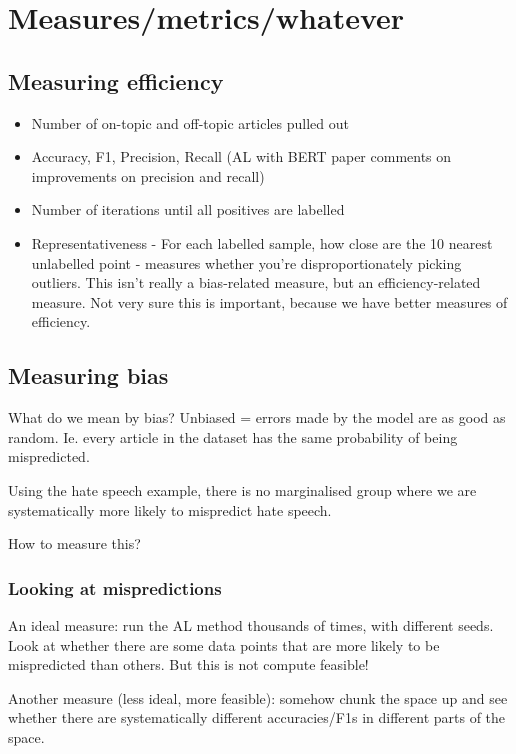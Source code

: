\documentclass[11pt]{article}
\begin{document}
\section{Measures/metrics/whatever}

\subsection{Measuring efficiency}

\begin{itemize}
    \item Number of on-topic and off-topic articles pulled out
    \item Accuracy, F1, Precision, Recall (AL with BERT paper comments on improvements on precision and recall)
    \item Number of iterations until all positives are labelled 
    \item Representativeness - For each labelled sample, how close are the 10 nearest unlabelled point - measures whether you’re disproportionately picking outliers. This isn’t really a bias-related measure, but an efficiency-related measure. Not very sure this is important, because we have better measures of efficiency. 
\end{itemize}



\subsection{Measuring bias}

What do we mean by bias? Unbiased = errors made by the model are as good as random. Ie. every article in the dataset has the same probability of being mispredicted.

Using the hate speech example, there is no marginalised group where we are systematically more likely to mispredict hate speech. 

How to measure this? 

\subsubsection{Looking at mispredictions}

An ideal measure: run the AL method thousands of times, with different seeds. Look at whether there are some data points that are more likely to be mispredicted than others. But this is not compute feasible! 

Another measure (less ideal, more feasible): somehow chunk the space up and see whether there are systematically different accuracies/F1s in different parts of the space. 
\end{document}
